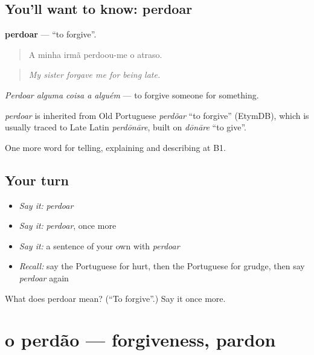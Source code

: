 \subsection*{You'll want to know: perdoar}
\textbf{perdoar} — \textquotedblleft{}to forgive\textquotedblright{}.

\begin{quote}
A minha irmã perdoou-me o atraso.
\end{quote}

\begin{quote}
\emph{My sister forgave me for being late.}
\end{quote}

\emph{Perdoar alguma coisa a alguém} — to forgive someone for something.

\begin{cousinweb}
\emph{perdoar} is inherited from Old Portuguese \emph{perdõar} \textquotedblleft{}to forgive\textquotedblright{} (EtymDB), which is usually traced to Late Latin \emph{perdōnāre}, built on \emph{dōnāre} \textquotedblleft{}to give\textquotedblright{}.
\end{cousinweb}

\begin{grammarlens}[title={What you've built}]
One more word for telling, explaining and describing at B1.
\end{grammarlens}

\subsection*{Your turn}
\begin{itemize}
\raggedright
  \item \emph{Say it:} \emph{perdoar}
  \item \emph{Say it:} \emph{perdoar}, once more
  \item \emph{Say it:} a sentence of your own with \emph{perdoar}
  \item \emph{Recall:} say the Portuguese for hurt, then the Portuguese for grudge, then say \emph{perdoar} again
\end{itemize}

\begin{tcolorbox}[breakable,colback=teal!4,colframe=teal!35!black,title={Before you move on}]
What does perdoar mean? (\textquotedblleft{}To forgive\textquotedblright{}.) Say it once more.
\end{tcolorbox}
\section[o perdão]{o perdão — forgiveness, pardon}

